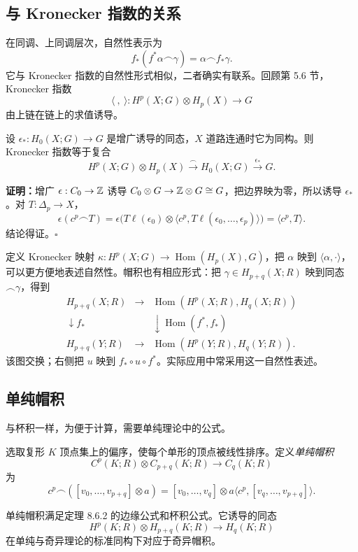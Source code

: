 \subsection*{与 Kronecker 指数的关系}
在同调、上同调层次，自然性表示为
\[f_*(f^*\alpha\frown\gamma)=\alpha\frown f_*\gamma.\]
它与 Kronecker 指数的自然性形式相似，二者确实有联系。回顾第 5.6 节，Kronecker 指数
\[\langle\ ,\ \rangle:H^p(X;G)\otimes H_p(X)\to G\]
由上链在链上的求值诱导。

设 $\epsilon_*:H_0(X;G)\to G$ 是增广诱导的同态，$X$ 道路连通时它为同构。则 Kronecker 指数等于复合
\[H^p(X;G)\otimes H_p(X)\xrightarrow{\frown}H_0(X;G)\xrightarrow{\epsilon_*}G.\]

\textbf{证明：}增广 $\epsilon:C_0\to\mathbb{Z}$ 诱导 $C_0\otimes G\to\mathbb{Z}\otimes G\cong G$，把边界映为零，所以诱导 $\epsilon_*$。对 $T:\Delta_p\to X$，
\[
\epsilon(c^p\frown T)=\epsilon\bigl(T\ell(\epsilon_0)\otimes
\langle c^p,T\ell(\epsilon_0,\ldots,\epsilon_p)\rangle\bigr)=\langle c^p,T\rangle.
\]
结论得证。\hfill$\square$

定义 Kronecker 映射 $\kappa:H^p(X;G)\to\operatorname{Hom}(H_p(X),G)$，把 $\alpha$ 映到 $\langle\alpha,\cdot\rangle$，可以更方便地表述自然性。帽积也有相应形式：把 $\gamma\in H_{p+q}(X;R)$ 映到同态 $\frown\gamma$，得到
\[
\begin{array}{ccc}
H_{p+q}(X;R)&\longrightarrow&\operatorname{Hom}(H^p(X;R),H_q(X;R))\\
\downarrow f_*&&\downarrow\operatorname{Hom}(f^*,f_*)\\
H_{p+q}(Y;R)&\longrightarrow&\operatorname{Hom}(H^p(Y;R),H_q(Y;R)).
\end{array}
\]
该图交换；右侧把 $u$ 映到 $f_*\circ u\circ f^*$。实际应用中常采用这一自然性表述。

\subsection*{单纯帽积}
与杯积一样，为便于计算，需要单纯理论中的公式。

选取复形 $K$ 顶点集上的偏序，使每个单形的顶点被线性排序。定义\emph{单纯帽积}
\[C^p(K;R)\otimes C_{p+q}(K;R)\to C_q(K;R)\]
为
\[
c^p\frown([v_0,\ldots,v_{p+q}]\otimes a)
=[v_0,\ldots,v_q]\otimes a\langle c^p,[v_q,\ldots,v_{p+q}]\rangle.
\]

单纯帽积满足定理 8.6.2 的边缘公式和杯积公式。它诱导的同态
\[H^p(K;R)\otimes H_{p+q}(K;R)\to H_q(K;R)\]
在单纯与奇异理论的标准同构下对应于奇异帽积。

